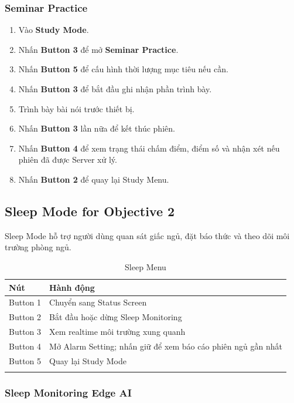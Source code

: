\documentclass[12pt,a4paper]{article}
\begin{document}
\subsubsection{Seminar Practice}

\begin{enumerate}
    \item Vào \textbf{Study Mode}.
    \item Nhấn \textbf{Button 3} để mở \textbf{Seminar Practice}.
    \item Nhấn \textbf{Button 5} để cấu hình thời lượng mục tiêu nếu cần.
    \item Nhấn \textbf{Button 3} để bắt đầu ghi nhận phần trình bày.
    \item Trình bày bài nói trước thiết bị.
    \item Nhấn \textbf{Button 3} lần nữa để kết thúc phiên.
    \item Nhấn \textbf{Button 4} để xem trạng thái chấm điểm, điểm số và nhận xét nếu phiên đã được Server xử lý.
    \item Nhấn \textbf{Button 2} để quay lại Study Menu.
\end{enumerate}

\subsection{Sleep Mode for Objective 2}

Sleep Mode hỗ trợ người dùng quan sát giấc ngủ, đặt báo thức và theo dõi môi trường phòng ngủ.

\begin{longtable}{|P{3cm}|P{11.5cm}|}
\hline
\textbf{Nút} & \textbf{Hành động} \\
\hline
Button 1 & Chuyển sang Status Screen \\
\hline
Button 2 & Bắt đầu hoặc dừng Sleep Monitoring \\
\hline
Button 3 & Xem realtime môi trường xung quanh \\
\hline
Button 4 & Mở Alarm Setting; nhấn giữ để xem báo cáo phiên ngủ gần nhất \\
\hline
Button 5 & Quay lại Study Mode \\
\hline
\caption{Sleep Menu}
\end{longtable}

\subsubsection{Sleep Monitoring Edge AI}
\end{document}
